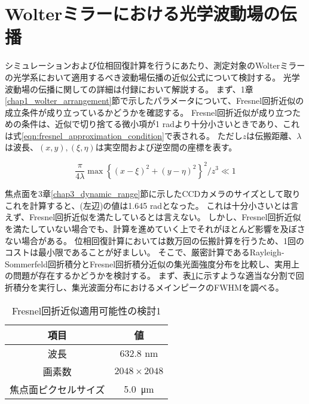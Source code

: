 \section{Wolterミラーにおける光学波動場の伝播}
\label{chap2_wolter_diffraction_apporoximation}

シミュレーションおよび位相回復計算を行うにあたり、測定対象のWolterミラーの光学系において適用するべき波動場伝播の近似公式について検討する。
光学波動場の伝播に関しての詳細は付録において解説する。
まず、1章\ref{chap1_wolter_arrangement}節で示したパラメータについて、Fresnel回折近似の成立条件が成り立っているかどうかを確認する。
Fresnel回折近似が成り立つための条件は、近似で切り捨てる微小項が1 radより十分小さいときであり、これは式\ref{eqn:fresnel_approximation_condition}で表される。
ただし$z$は伝搬距離、$\lambda$は波長、$(x, y), (\xi, \eta)$は実空間および逆空間の座標を表す。

\begin{equation}
\label{eqn:fresnel_approximation_condition}
    \frac{\pi}{4\lambda} \max \left\{ (x-\xi)^2 + (y-\eta)^2 \right\}^2 / z^3 \ll 1
\end{equation}

焦点面を3章\ref{chap3_dynamic_range}節に示したCCDカメラのサイズとして取りこれを計算すると、(左辺)の値は1.645 radとなった。
これは十分小さいとは言えず、Fresnel回折近似を満たしているとは言えない。
しかし、Fresnel回折近似を満たしていない場合でも、計算を進めていく上でそれがほとんど影響を及ぼさない場合がある。
位相回復計算においては数万回の伝搬計算を行うため、1回のコストは最小限であることが好ましい。
そこで、厳密計算であるRayleigh-Sommerfeld回折積分とFresnel回折積分近似の集光面強度分布を比較し、実用上の問題が存在するかどうかを検討する。
まず、表\ref{tb:check_approximation_validity_1}に示すような適当な分割で回折積分を実行し、集光波面分布におけるメインピークのFWHMを調べる。

\begin{table}[!ht]
\begin{center}
  \caption{Fresnel回折近似適用可能性の検討1}
  \begin{tabular}{|c|c|} \hline
    項目 & 値 \\ \hline
    波長 & 632.8 nm \\
    画素数 & $2048 \times 2048$ \\
    焦点面ピクセルサイズ & \SI{5.0}{\micro \metre} \\ \hline
  \end{tabular}
  \label{tb:check_approximation_validity_1}
\end{center}
\end{table}

